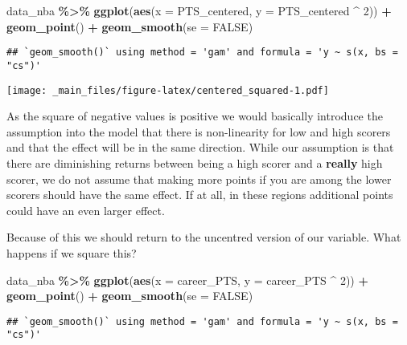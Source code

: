 \documentclass[
]{book}
\newenvironment{Shaded}{\begin{snugshade}}{\end{snugshade}}
\newcommand{\AttributeTok}[1]{\textcolor[rgb]{0.13,0.29,0.53}{#1}}
\newcommand{\ConstantTok}[1]{\textcolor[rgb]{0.56,0.35,0.01}{#1}}
\newcommand{\DecValTok}[1]{\textcolor[rgb]{0.00,0.00,0.81}{#1}}
\newcommand{\FunctionTok}[1]{\textcolor[rgb]{0.13,0.29,0.53}{\textbf{#1}}}
\newcommand{\NormalTok}[1]{#1}
\newcommand{\SpecialCharTok}[1]{\textcolor[rgb]{0.81,0.36,0.00}{\textbf{#1}}}
\begin{document}
\begin{Shaded}
\begin{Highlighting}[]
\NormalTok{data\_nba }\SpecialCharTok{\%\textgreater{}\%} 
  \FunctionTok{ggplot}\NormalTok{(}\FunctionTok{aes}\NormalTok{(}\AttributeTok{x =}\NormalTok{ PTS\_centered, }\AttributeTok{y =}\NormalTok{ PTS\_centered }\SpecialCharTok{\^{}} \DecValTok{2}\NormalTok{)) }\SpecialCharTok{+}
  \FunctionTok{geom\_point}\NormalTok{() }\SpecialCharTok{+}
  \FunctionTok{geom\_smooth}\NormalTok{(}\AttributeTok{se =} \ConstantTok{FALSE}\NormalTok{)}
\end{Highlighting}
\end{Shaded}

\begin{verbatim}
## `geom_smooth()` using method = 'gam' and formula = 'y ~ s(x, bs = "cs")'
\end{verbatim}

\texttt{[image: \_main\_files/figure-latex/centered\_squared-1.pdf]}

As the square of negative values is positive we would basically introduce the
assumption into the model that there is non-linearity for low and high scorers
and that the effect will be in the same direction. While our assumption is that
there are diminishing returns between being a high scorer and a \textbf{really} high
scorer, we do not assume that making more points if you are among the lower
scorers should have the same effect. If at all, in these regions additional
points could have an even larger effect.

Because of this we should return to the uncentred version of our variable. What
happens if we square this?

\begin{Shaded}
\begin{Highlighting}[]
\NormalTok{data\_nba }\SpecialCharTok{\%\textgreater{}\%} 
  \FunctionTok{ggplot}\NormalTok{(}\FunctionTok{aes}\NormalTok{(}\AttributeTok{x =}\NormalTok{ career\_PTS, }\AttributeTok{y =}\NormalTok{ career\_PTS }\SpecialCharTok{\^{}} \DecValTok{2}\NormalTok{)) }\SpecialCharTok{+}
  \FunctionTok{geom\_point}\NormalTok{() }\SpecialCharTok{+}
  \FunctionTok{geom\_smooth}\NormalTok{(}\AttributeTok{se =} \ConstantTok{FALSE}\NormalTok{)}
\end{Highlighting}
\end{Shaded}

\begin{verbatim}
## `geom_smooth()` using method = 'gam' and formula = 'y ~ s(x, bs = "cs")'
\end{verbatim}
\end{document}
